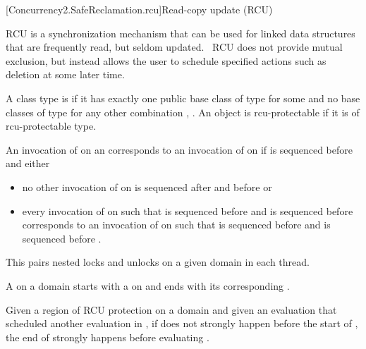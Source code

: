 
[Concurrency2.SafeReclamation.rcu]{Read-copy update (RCU)}

\pnum
RCU is a synchronization mechanism that can be used for linked data
structures that are frequently read, but seldom updated.  RCU does
not provide mutual exclusion, but instead allows the user to schedule
specified actions such as deletion at some later time.

\pnum
A class type  is  if it has exactly one
public base class of type  for some 
and no base classes of type  for any other
combination , . An object is rcu-protectable if it is
of rcu-protectable type.

\pnum
An invocation of  on an  corresponds
to an invocation of  on  if  is
sequenced before  and either

\begin{itemize}
\item	no other invocation of  on  is sequenced
	after  and before  or
\item	every invocation of  on  such
	that  is sequenced before  and 
	is sequenced before  corresponds to an invocation of
	 on  such that  is sequenced
	before  and  is sequenced before .
\end{itemize}


\pnum
\begin{note}
This pairs nested locks and unlocks on a given domain in each thread.
\end{note}

\pnum
A  on a domain  starts
with a  on  and ends with its corresponding
.

\pnum
Given a region of RCU protection  on a domain 
and given an evaluation  that scheduled another evaluation
 in , if  does not strongly happen before
the start of , the end of  strongly happens before
evaluating .

